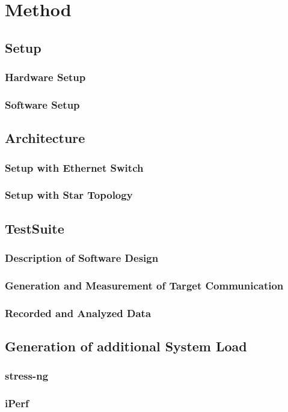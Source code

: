 \chapter{Method}


\section{Setup}


\subsection{Hardware Setup}


\subsection{Software Setup}


\section{Architecture}


\subsection{Setup with Ethernet Switch}


\subsection{Setup with Star Topology}


\section{TestSuite}


\subsection{Description of Software Design}


\subsection{Generation and Measurement of Target Communication}


\subsection{Recorded and Analyzed Data}


\section{Generation of additional System Load}


\subsection{stress-ng}


\subsection{iPerf}
